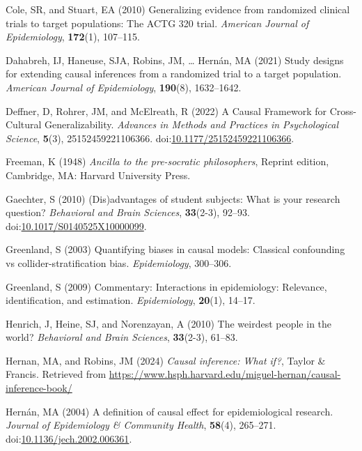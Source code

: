 \documentclass[
  single column]{article}
\newlength{\cslhangindent}
\newenvironment{CSLReferences}[2] %
 {\begin{list}{}{%
  \setlength{\itemindent}{0pt}
  \setlength{\leftmargin}{0pt}
  \setlength{\parsep}{0pt}
  \ifodd #1
   \setlength{\leftmargin}{\cslhangindent}
   \setlength{\itemindent}{-1\cslhangindent}
  \fi
  \setlength{\itemsep}{#2\baselineskip}}}
 {\end{list}}
\begin{document}
\begin{CSLReferences}{1}{0}
Cole, SR, and Stuart, EA (2010) Generalizing evidence from randomized
clinical trials to target populations: The ACTG 320 trial.
\emph{American Journal of Epidemiology}, \textbf{172}(1), 107--115.

Dahabreh, IJ, Haneuse, SJA, Robins, JM, \ldots{} Hernán, MA (2021) Study
designs for extending causal inferences from a randomized trial to a
target population. \emph{American Journal of Epidemiology},
\textbf{190}(8), 1632--1642.

Deffner, D, Rohrer, JM, and McElreath, R (2022) A Causal Framework for
Cross-Cultural Generalizability. \emph{Advances in Methods and Practices
in Psychological Science}, \textbf{5}(3), 25152459221106366.
doi:\href{https://doi.org/10.1177/25152459221106366}{10.1177/25152459221106366}.

Freeman, K (1948) \emph{Ancilla to the pre-socratic philosophers},
Reprint edition, Cambridge, MA: Harvard University Press.

Gaechter, S (2010) (Dis)advantages of student subjects: What is your
research question? \emph{Behavioral and Brain Sciences},
\textbf{33}(2-3), 92--93.
doi:\href{https://doi.org/10.1017/S0140525X10000099}{10.1017/S0140525X10000099}.

Greenland, S (2003) Quantifying biases in causal models: Classical
confounding vs collider-stratification bias. \emph{Epidemiology},
300--306.

Greenland, S (2009) Commentary: Interactions in epidemiology: Relevance,
identification, and estimation. \emph{Epidemiology}, \textbf{20}(1),
14--17.

Henrich, J, Heine, SJ, and Norenzayan, A (2010) The weirdest people in
the world? \emph{Behavioral and Brain Sciences}, \textbf{33}(2-3),
61--83.

Hernan, MA, and Robins, JM (2024) \emph{Causal inference: What if?},
Taylor \& Francis. Retrieved from
\url{https://www.hsph.harvard.edu/miguel-hernan/causal-inference-book/}

Hernán, MA (2004) A definition of causal effect for epidemiological
research. \emph{Journal of Epidemiology \& Community Health},
\textbf{58}(4), 265--271.
doi:\href{https://doi.org/10.1136/jech.2002.006361}{10.1136/jech.2002.006361}.


\end{CSLReferences}
\end{document}
